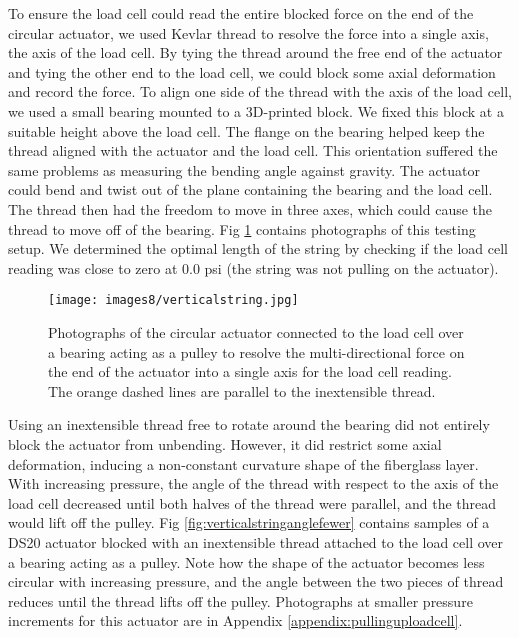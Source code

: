 To ensure the load cell could read the entire blocked force on the end of the circular actuator, we used Kevlar thread to resolve the force into a single axis, the axis of the load cell. By tying the thread around the free end of the actuator and tying the other end to the load cell, we could block some axial deformation and record the force. To align one side of the thread with the axis of the load cell, we used a small bearing mounted to a 3D-printed block. We fixed this block at a suitable height above the load cell. The flange on the bearing helped keep the thread aligned with the actuator and the load cell. This orientation suffered the same problems as measuring the bending angle against gravity. The actuator could bend and twist out of the plane containing the bearing and the load cell. The thread then had the freedom to move in three axes, which could cause the thread to move off of the bearing. Fig \ref{fig:verticalstring} contains photographs of this testing setup. We determined the optimal length of the string by checking if the load cell reading was close to zero at 0.0 psi (the string was not pulling on the actuator). 

\begin{figure}[ht]
    \centering
     \texttt{[image: images8/verticalstring.jpg]}
    \caption{Photographs of the circular actuator connected to the load cell over a bearing acting as a pulley to resolve the multi-directional force on the end of the actuator into a single axis for the load cell reading. The orange dashed lines are parallel to the inextensible thread.}
    \label{fig:verticalstring}
\end{figure}

Using an inextensible thread free to rotate around the bearing did not entirely block the actuator from unbending. However, it did restrict some axial deformation, inducing a non-constant curvature shape of the fiberglass layer. With increasing pressure, the angle of the thread with respect to the axis of the load cell decreased until both halves of the thread were parallel, and the thread would lift off the pulley. Fig \ref{fig:verticalstringanglefewer} contains samples of a DS20 actuator blocked with an inextensible thread attached to the load cell over a bearing acting as a pulley. Note how the shape of the actuator becomes less circular with increasing pressure, and the angle between the two pieces of thread reduces until the thread lifts off the pulley. Photographs at smaller pressure increments for this actuator are in Appendix \ref{appendix:pullinguploadcell}. 


